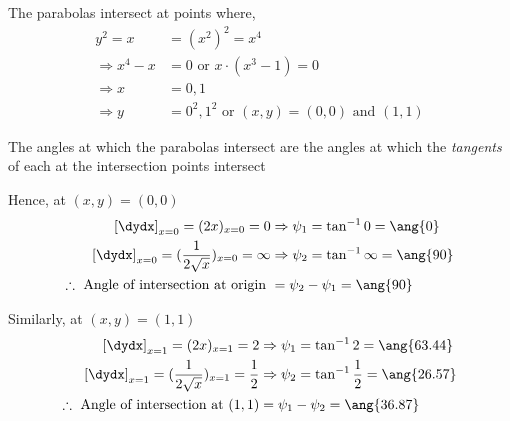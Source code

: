 \begin{solution}[\fullpage]
	The parabolas intersect at points where, 
	\begin{align}
		y^2 = x &= (x^2)^2 = x^4 \\
		\Rightarrow x^4-x &= 0 \text{ or } x\cdot(x^3-1) = 0 \\
		\Rightarrow x &= 0,1 \\
		\Rightarrow y &= 0^2, 1^2 \text{ or } (x,y) = (0,0) \text{ and } (1,1)
	\end{align}
	
	The angles at which the parabolas intersect are the angles at which 
	the \textit{tangents} of each at the intersection points intersect
	
	Hence, at $(x,y) = (0,0)$
	\begin{align}
		\left[\dydx\right]_{x=0} = (2x)_{x=0} = 0 &\Rightarrow \psi_1 = \tan^{-1}0 = \ang{0} \\
		\left[\dydx\right]_{x=0} = (\dfrac{1}{2\sqrt{x}})_{x=0} = \infty &\Rightarrow \psi_2 
		= \tan^{-1}\infty = \ang{90} \\
		\therefore\text{ Angle of intersection at origin } &= \psi_2-\psi_1 = \ang{90}
	\end{align}
	
	Similarly, at $(x,y) = (1,1)$
	\begin{align}
		\left[\dydx\right]_{x=1} = (2x)_{x=1} = 2 &\Rightarrow \psi_1 = \tan^{-1}2 = \ang{63.44} \\
		\left[\dydx\right]_{x=1} = (\dfrac{1}{2\sqrt{x}})_{x=1} = \frac{1}{2} &\Rightarrow \psi_2 
		= \tan^{-1}\frac{1}{2} = \ang{26.57} \\
		\therefore\text{ Angle of intersection at }(1,1) &= \psi_1-\psi_2 = \ang{36.87}
	\end{align}
\end{solution}
